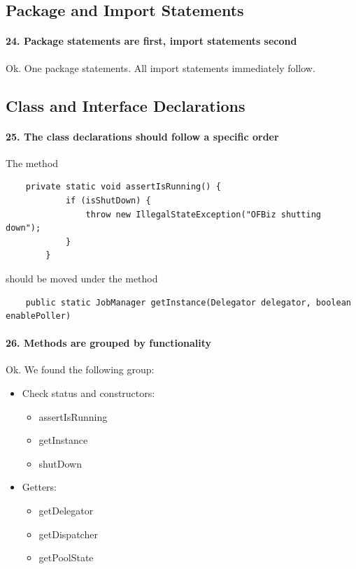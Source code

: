 \documentclass[english]{article}
\begin{document}
{{\subsection{Package and Import Statements}
\paragraph{24. Package statements are first, import statements second}
Ok.
One package statements.
All import statements immediately follow.

\subsection{Class and Interface Declarations}
\paragraph{25. The class declarations should follow a specific order}

The method 
\begin{lstlisting}
	private static void assertIsRunning() {
	        if (isShutDown) {
	            throw new IllegalStateException("OFBiz shutting down");
	        }
	    }
\end{lstlisting}
should be moved under the method 

\begin{lstlisting}
	public static JobManager getInstance(Delegator delegator, boolean enablePoller)
\end{lstlisting}

\paragraph{26. Methods are grouped by functionality}
Ok.
We found the following group:
\begin{itemize}
	\item Check status and constructors:
	\begin{itemize}
		\item{assertIsRunning}
		\item{getInstance}
		\item{shutDown}
	\end{itemize}

	\item Getters:
	\begin{itemize}
		\item{getDelegator}
		\item{getDispatcher}
		\item{getPoolState}
	\end{itemize}


\end{itemize}}}
\end{document}
